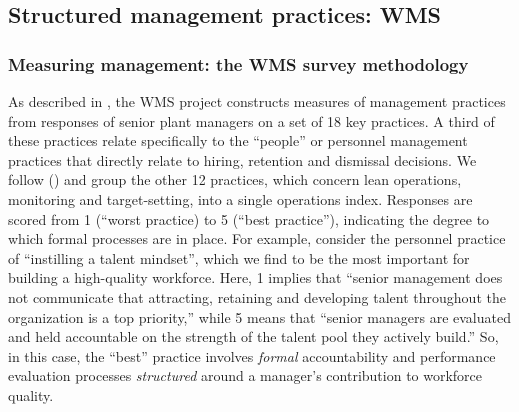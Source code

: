 
	
\subsection{Structured management practices: WMS}


\subsubsection{Measuring management: the WMS survey methodology}
As described in \citet{bloom_qje2007}, the WMS project constructs measures of management practices from responses of senior plant managers on a set of 18 key practices. A third of these practices relate specifically to the ``people'' or personnel management practices that directly relate to hiring, retention and dismissal decisions. We follow (\citet{lemos_ej}) and group the other 12 practices, which concern lean operations, monitoring and target-setting, into a single operations index.  Responses are scored from 1 (``worst practice) to 5 (``best practice''), indicating the degree to which formal processes are in place. 
For example, consider the personnel practice of ``instilling a talent mindset'', which we find to be the most important for building a high-quality workforce.  Here, 1 implies that ``senior management does not communicate that attracting, retaining and developing talent throughout the organization is a top priority,'' while 5 means that ``senior managers are evaluated and held accountable on the strength of the talent pool they actively build.'' So, in this case, the ``best'' practice involves \textit{formal} accountability and performance evaluation processes \textit{structured} around a manager's contribution to workforce quality.


